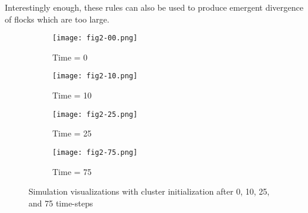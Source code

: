Interestingly enough, these rules can also be used to produce emergent
divergence of flocks which are too large.

\begin{figure}[h!]
  \centering
  \begin{subfigure}{0.24\textwidth}
    \centering
    \texttt{[image: fig2-00.png]}
    \caption{Time = 0}
  \end{subfigure}
  \begin{subfigure}{0.24\textwidth}
    \centering
    \texttt{[image: fig2-10.png]}
    \caption{Time = 10}
  \end{subfigure}
  \begin{subfigure}{0.24\textwidth}
    \centering
    \texttt{[image: fig2-25.png]}
    \caption{Time = 25}
  \end{subfigure}
  \begin{subfigure}{0.24\textwidth}
    \centering
    \texttt{[image: fig2-75.png]}
    \caption{Time = 75}
  \end{subfigure}
  
  \caption{Simulation visualizations with cluster initialization after
    0, 10, 25, and 75 time-steps}
  \label{fig:visuals}
\end{figure}
